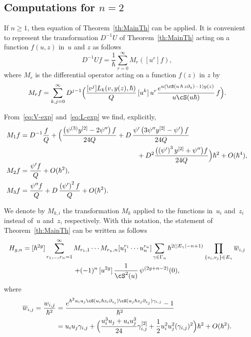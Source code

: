 \subsection{Computations for \texorpdfstring{$n=2$}{n=2}}
If $n\ge1$, then equation of Theorem~\ref{th:MainTh} can be applied.
It is convenient to represent the transformation $D^{-1}U$ of Theorem~\ref{th:MainTh} acting on a function $f(u,z)$ in~$u$ and $z$ as follows
\begin{equation*}
D^{-1}U f=\frac1{\hbar}\sum_{r=0}^\infty M_r([u^r]f),
\end{equation*}
where $M_r$ is the differential operator acting on a function $f(z)$ in $z$ by
\begin{equation*}
M_rf=\sum_{k,j=0}^\infty D^{j-1}\Bigl(\frac{[v^j] L_{k}(v,y(z),\hbar)}{Q}\,[u^k]\,u^r\frac{e^{u(\cS(u\,\hbar\,z\partial_z)-1)y(z)}}{u \cS(u\hbar)}\,f\Bigr).
\end{equation*}

From~\eqref{eq:V-exp} and~\eqref{eq:L-exp} we find, explicitly,
\begin{align*}
M_1f&=D^{-1}\frac{f}{Q}+
\Bigl(\frac{\left(\psi^{(3)} y^{[2]}-2 \psi''\right)f}{24Q}
+ D\,\frac{\psi' \left(3 \psi'' y^{[2]}-\psi'\right)f}{24Q}\\
&\hspace*{6cm}
+ D^2\frac{\bigl(\left(\psi'\right)^3 y^{[2]}+\psi''\bigr)f}{24Q}
\Bigr)\hbar ^2 +O(\hbar^4),\\[-5pt]
M_2f&=\frac{\psi'f}{Q}+O(\hbar^2),\\
M_3f&=
\frac{\psi''f}{Q}
+D\,\frac{\left(\psi'\right)^2f}{Q}
+O(\hbar^2).
\end{align*}

We denote by $M_{k,i}$ the transformation $M_k$ applied to the functions in~$u_i$ and~$z_i$ instead of~$u$ and~$z$, respectively. With this notation, the statement of Theorem~\ref{th:MainTh} can be written as follows
\begin{multline*}
H_{g,n} = [\hbar^{2g}] \sum_{r_1,\dots,r_n=1}^\infty M_{r_1,1}\cdots M_{r_n,n} [u_1^{r_1}\cdots u_n^{r_n}]
\sum\limits_{\gamma\in\Gamma_n}\hbar^{2(|E_\gamma|-n+1)}\prod\limits_{\{v_i,v_j\}\in E_\gamma} \overline w_{i,j}\\
+ (-1)^{n}\,[u^{2g}]\,\frac1{\cS^2(u)}\,\psi^{(2g+n-2)}(0),
\end{multline*}
where
\begin{align*}
\overline w_{i,j}=\frac{w_{i,j}}{\hbar^2}& =\frac{e^{\hbar^2u_iu_j\cS(u_i\hbar z_i\partial_{z_i})\cS(u_j\hbar z_j\partial_{z_j})\gamma_{i,j}}-1}{\hbar^{2}}\\
&=u_iu_j\gamma_{i,j}+ \Bigl(\frac{u_i^3u_j+u_iu_j^3}{24}\gamma_{i,j}^{[2]}
+\frac12 u_i^2u_j^2(\gamma_{i,j})^2 \Bigr)\hbar^2+O(\hbar^2).
\end{align*}

